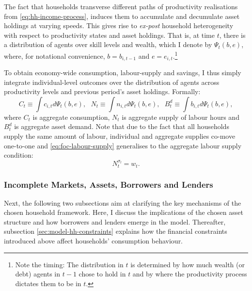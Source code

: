 \documentclass[12pt]{article} %
\numberwithin{equation}{section} %
\numberwithin{figure}{section}
\numberwithin{table}{section}
\begin{document}
The fact that households transverse different paths of productivity realisations from \eqref{eq:hh-income-process}, induces them to accumulate and decumulate asset holdings at varying speeds. This gives rise to \textit{ex-post} household heterogeneity with respect to productivity states and asset holdings. That is, at time $t$, there is a distribution of agents over skill levels and wealth, which I denote by $\Psi_t (b,e)$, where, for notational convenience, $b=b_{i,t-1}$ and $e=e_{i,t}$.\footnote{Note the timing: The distribution in $t$ is determined by how much wealth (or debt) agents in $t-1$ chose to hold in $t$ and by where the productivity process dictates them to be in $t$.}


To obtain economy-wide consumption, labour-supply and savings, I thus simply integrate individual-level outcomes over the distribution of agents across productivity levels and previous period's asset holdings. Formally:
\begin{equation}
    C_t \equiv \int c_{i,t} d \Psi_t (b,e), \ \ \ N_t \equiv \int n_{i,t} d \Psi_t (b,e), \ \ \ B_t^d \equiv \int b_{i,t} d \Psi_t (b,e), \label{eq:hh-aggregation}
\end{equation}
where $C_t$ is aggregate consumption, $N_t$ is aggregate supply of labour hours and $B_t^d$ is aggregate asset demand. Note that due to the fact that all households supply the same amount of labour, individual and aggregate supplies co-move one-to-one and \eqref{eq:foc-labour-supply} generalises to the aggregate labour supply condition:
\begin{equation}
    N_t^{\sigma_l} = w_t. \label{eq:hh-agg-labour-supply}
\end{equation}


\subsubsection{Incomplete Markets, Assets, Borrowers and Lenders}
\label{sec:model-hh-assets}

Next, the following two subsections aim at clarifying the key mechanisms of the chosen household framework. Here, I discuss the implications of the chosen asset structure and how borrowers and lenders emerge in the model. Thereafter, subsection \ref{sec:model-hh-constraints} explains how the financial constraints introduced above affect households' consumption behaviour.  
\end{document}
